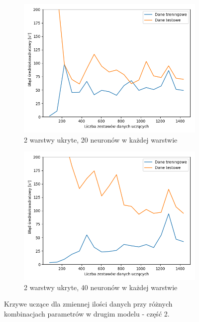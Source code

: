 \documentclass[12pt]{aghdpl}
\begin{document}
		\begin{figure}[h]
			\centering
		 	\begin{subfigure}{.8\linewidth}
		 		\includegraphics[width =\linewidth]{wykresy/4_zwiekszenie_stopnia_skomplikowania_modelu/2_warstwy_20_neuronow_learning_curves.png}
		 		\caption{2 warstwy ukryte, 20 neuronów w każdej warstwie}
		 	\end{subfigure}
		 	\begin{subfigure}{.8\linewidth}
		 		\includegraphics[width =\linewidth]{wykresy/4_zwiekszenie_stopnia_skomplikowania_modelu/2_warstwy_40_neuronow_learning_curves.png}
		 		\caption{2 warstwy ukryte, 40 neuronów w każdej warstwie}
		 	\end{subfigure}
	 	
 			\caption{Krzywe uczące dla zmiennej ilości danych przy różnych kombinacjach parametrów w drugim modelu - część 2.}
			\label{fig: drugi_model_kombinacje_parametrow_learning_curves_2}
		\end{figure}
		
\end{document}
